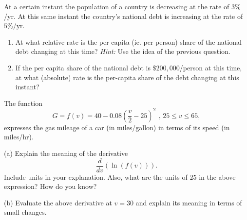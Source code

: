 \documentclass{ximera}
\begin{document}
\begin{question} \label{Q34vcvnhh}
At a certain instant the population of a country is decreasing at the rate of $3\%$/yr. At this same instant the country's national debt is increasing at the rate of $5\%$/yr.

\begin{enumerate}
\item At what relative rate is the per capita (ie. per person) share of the national debt changing at this time? \emph{Hint:} Use the idea of the previous question.

\item If the per capita share of the national debt is $\$200,000$/person at this time, at what (absolute) rate is the per-capita share of the debt changing at this instant?

\end{enumerate}
\end{question}


\begin{question}  \label{Qddfdsf4thmm}
The function 
\[ 
      G = f(v) = 40-0.08\left(\frac{v}{2}-25\right)^{2}\, \ , \, 25\leq v\leq 65 ,
\]
expresses the gas mileage of a car (in miles/gallon) in terms of its speed (in miles/hr).

(a) Explain the meaning of the derivative 
\[
     \frac{d}{dv} \left( \ln (f(v)) \right) .
\]
Include units in your explanation. Also, what are the units of $25$ in the above expression? How do you know?

(b) Evaluate the above derivative at $v=30$ and explain its meaning in terms of small changes.

\end{question}
\end{document}
